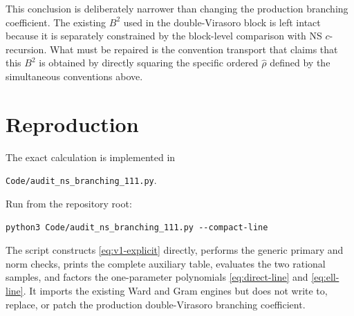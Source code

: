 \documentclass[11pt]{article}
\newcommand{\hatrho}{\widehat\rho}
\begin{document}
This conclusion is deliberately narrower than changing the production
branching coefficient.  The existing \(B^2\) used in the double-Virasoro
block is left intact because it is separately constrained by the block-level
comparison with NS \(c\)-recursion.  What must be repaired is the convention
transport that claims that this \(B^2\) is obtained by directly squaring the
specific ordered \(\hatrho\) defined by the simultaneous conventions above.

\section{Reproduction}

The exact calculation is implemented in
\begin{center}
\texttt{Code/audit\_ns\_branching\_111.py}.
\end{center}
Run from the repository root:
\begin{verbatim}
python3 Code/audit_ns_branching_111.py --compact-line
\end{verbatim}
The script constructs \eqref{eq:v1-explicit} directly, performs the generic
primary and norm checks, prints the complete auxiliary table, evaluates the
two rational samples, and factors the one-parameter polynomials
\eqref{eq:direct-line} and \eqref{eq:ell-line}.  It imports the existing Ward
and Gram engines but does not write to, replace, or patch the production
double-Virasoro branching coefficient.
\end{document}
